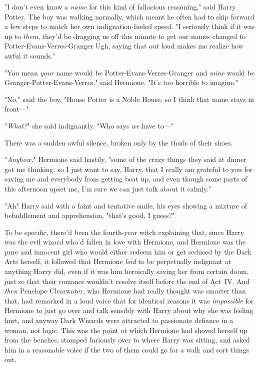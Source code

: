 "I don't even know a \emph{name} for this kind of fallacious reasoning," said
Harry Potter. The boy was walking normally, which meant he often had to skip
forward a few steps to match her own indignation-fueled speed. "I seriously
think if it was up to \emph{them}, they'd be dragging us off this minute to get
our names changed to Potter-Evans-Verres-Granger{\el} Ugh, saying that out
loud makes me realize how awful it sounds."

"You mean \emph{your} name would be Potter-Evans-Verres-Granger and \emph{mine}
would be Granger-Potter-Evans-Verres," said Hermione. "It's too horrible to
imagine."

"No," said the boy, "House Potter is a Noble House, so I think that name stays
in front\mbox{---}"

"\emph{What?}" she said indignantly. "Who says \emph{we} have to\mbox{---}"

There was a sudden awful silence, broken only by the thuds of their shoes.

"\emph{Anyhow,}" Hermione said hastily, "some of the crazy things they said at
dinner got me thinking, so I just want to say, Harry, that I really am grateful
to you for saving me and everybody from getting beat up, and even though some
parts of this afternoon upset me, I'm sure we can just talk about it calmly."

"Ah{\el}" Harry said with a faint and tentative smile, his eyes showing a
mixture of befuddlement and apprehension, "that's{\el} good, I guess?"

To be specific, there'd been the fourth-year witch explaining that, since Harry
was the evil wizard who'd fallen in love with Hermione, and Hermione was the
pure and innocent girl who would either redeem him or get seduced by the Dark
Arts herself, it followed that Hermione \emph{had} to be perpetually indignant
at anything Harry did, even if it was him heroically saving her from certain
doom, just so that their romance wouldn't resolve itself before the end of
Act~IV. And \emph{then} Penelope Clearwater, who Hermione had really thought was
smarter than that, had remarked in a loud voice that for identical reasons it
was \emph{impossible} for Hermione to just go over and talk sensibly with Harry
about why she was feeling hurt, and anyway Dark Wizards were attracted to
passionate defiance in a woman, not logic. This was the point at which Hermione
had shoved herself up from the benches, stomped furiously over to where Harry
was sitting, and asked him in a reasonable voice if the two of them could go
for a walk and sort things out.

